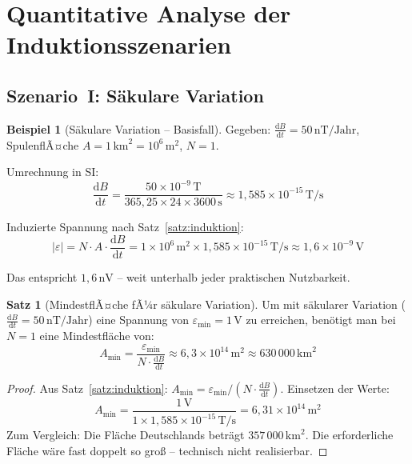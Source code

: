﻿\documentclass[a4paper,12pt]{article}
\theoremstyle{definition}
\newtheorem{beispiel}{Beispiel}
\newtheorem{satz}{Satz}
\begin{document}
\section{Quantitative Analyse der Induktionsszenarien}

\subsection{Szenario~I: S\"akulare Variation}

\begin{beispiel}[S\"akulare Variation -- Basisfall]
\label{bsp:sekular}
    Gegeben: $\tfrac{\mathrm{d}B}{\mathrm{d}t} = 50\,\mathrm{nT/Jahr}$,
    SpulenflÃ¤che $A = 1\,\mathrm{km}^2 = 10^6\,\mathrm{m}^2$, $N = 1$.

    Umrechnung in SI:
    \[
        \frac{\mathrm{d}B}{\mathrm{d}t}
        = \frac{50 \times 10^{-9}\,\mathrm{T}}{365{,}25 \times 24 \times 3600\,\mathrm{s}}
        \approx 1{,}585 \times 10^{-15}\,\mathrm{T/s}
    \]

    Induzierte Spannung nach Satz~\ref{satz:induktion}:
    \[
        |\varepsilon| = N \cdot A \cdot \frac{\mathrm{d}B}{\mathrm{d}t}
        = 1 \times 10^6\,\mathrm{m}^2 \times 1{,}585 \times 10^{-15}\,\mathrm{T/s}
        \approx 1{,}6 \times 10^{-9}\,\mathrm{V}
    \]

    Das entspricht $1{,}6\,\mathrm{nV}$ -- weit unterhalb jeder praktischen Nutzbarkeit.
\end{beispiel}

\begin{satz}[MindestflÃ¤che fÃ¼r s\"akulare Variation]
\label{satz:minflaeche_sekular}
    Um mit s\"akularer Variation ($\tfrac{\mathrm{d}B}{\mathrm{d}t} = 50\,\mathrm{nT/Jahr}$)
    eine Spannung von $\varepsilon_{\min} = 1\,\mathrm{V}$ zu erreichen,
    ben\"otigt man bei $N = 1$ eine Mindestfl\"ache von:
    \[
        A_{\min} = \frac{\varepsilon_{\min}}{N \cdot \tfrac{\mathrm{d}B}{\mathrm{d}t}}
        \approx 6{,}3 \times 10^{14}\,\mathrm{m}^2 \approx 630\,000\,\mathrm{km}^2
    \]
\end{satz}

\begin{proof}
    Aus Satz~\ref{satz:induktion}: $A_{\min} = \varepsilon_{\min} / (N \cdot \tfrac{\mathrm{d}B}{\mathrm{d}t})$.
    Einsetzen der Werte:
    \[
        A_{\min} = \frac{1\,\mathrm{V}}{1 \times 1{,}585 \times 10^{-15}\,\mathrm{T/s}}
        = 6{,}31 \times 10^{14}\,\mathrm{m}^2
    \]
    Zum Vergleich: Die Fl\"ache Deutschlands betr\"agt $357\,000\,\mathrm{km}^2$.
    Die erforderliche Fl\"ache w\"are fast doppelt so gro{\ss} -- technisch nicht realisierbar.
\end{proof}
\end{document}
